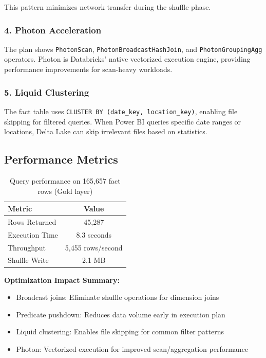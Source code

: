 \documentclass[11pt,a4paper]{article}
\begin{document}
This pattern minimizes network transfer during the shuffle phase.

\subsubsection{4. Photon Acceleration}

The plan shows \texttt{PhotonScan}, \texttt{PhotonBroadcastHashJoin}, and \texttt{PhotonGroupingAgg} operators. Photon is Databricks' native vectorized execution engine, providing performance improvements for scan-heavy workloads.

\subsubsection{5. Liquid Clustering}

The fact table uses \texttt{CLUSTER BY (date\_key, location\_key)}, enabling file skipping for filtered queries. When Power BI queries specific date ranges or locations, Delta Lake can skip irrelevant files based on statistics.

\subsection{Performance Metrics}

\begin{table}[h]
\centering
\begin{tabular}{@{}lc@{}}
\toprule
\textbf{Metric} & \textbf{Value} \\
\midrule
Rows Returned & 45,287 \\
Execution Time & 8.3 seconds \\
Throughput & 5,455 rows/second \\
Shuffle Write & 2.1 MB \\
\bottomrule
\end{tabular}
\caption{Query performance on 165,657 fact rows (Gold layer)}
\end{table}

\textbf{Optimization Impact Summary:}
\begin{itemize}
    \item Broadcast joins: Eliminate shuffle operations for dimension joins
    \item Predicate pushdown: Reduces data volume early in execution plan
    \item Liquid clustering: Enables file skipping for common filter patterns
    \item Photon: Vectorized execution for improved scan/aggregation performance
\end{itemize}
\end{document}
